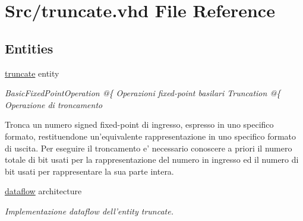 \hypertarget{truncate_8vhd}{\section{Src/truncate.vhd File Reference}
\label{truncate_8vhd}
}
\subsection*{Entities}
\begin{DoxyCompactItemize}
\item 
\hyperlink{classtruncate}{truncate} entity
\begin{DoxyCompactList}\small\item\em Basic\+Fixed\+Point\+Operation @\{  Operazioni fixed-\/point basilari  Truncation @\{  Operazione di troncamento

Tronca un numero signed fixed-\/point di ingresso, espresso in uno specifico formato, restituendone un'equivalente rappresentazione in uno specifico formato di uscita. Per eseguire il troncamento e' necessario conoscere a priori il numero totale di bit usati per la rappresentazione del numero in ingresso ed il numero di bit usati per rappresentare la sua parte intera. \end{DoxyCompactList}\item 
\hyperlink{classtruncate_1_1dataflow}{dataflow} architecture
\begin{DoxyCompactList}\small\item\em Implementazione dataflow dell'entity truncate. \end{DoxyCompactList}\end{DoxyCompactItemize}


